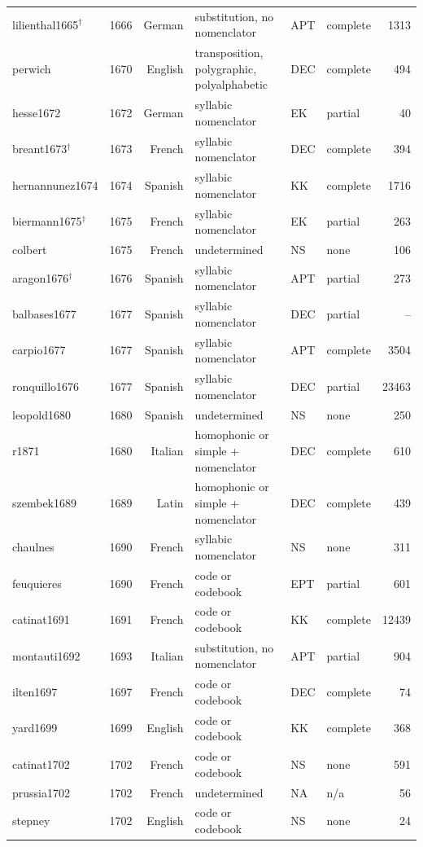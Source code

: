 {\begin{longtable}{@{}llrlllr@{}}
lilienthal1665$^\dagger$ & 1666 & German & substitution, no nomenclator & APT & complete & 1313 \\
perwich & 1670 & English & transposition, polygraphic, polyalphabetic & DEC & complete & 494 \\
hesse1672 & 1672 & German & syllabic nomenclator & EK & partial & 40 \\
breant1673$^\dagger$ & 1673 & French & syllabic nomenclator & DEC & complete & 394 \\
hernannunez1674 & 1674 & Spanish & syllabic nomenclator & KK & complete & 1716 \\
biermann1675$^\dagger$ & 1675 & French & syllabic nomenclator & EK & partial & 263 \\
colbert & 1675 & French & undetermined & NS & none & 106 \\
aragon1676$^\dagger$ & 1676 & Spanish & syllabic nomenclator & APT & partial & 273 \\
balbases1677 & 1677 & Spanish & syllabic nomenclator & DEC & partial & -- \\
carpio1677 & 1677 & Spanish & syllabic nomenclator & APT & complete & 3504 \\
ronquillo1676 & 1677 & Spanish & syllabic nomenclator & DEC & partial & 23463 \\
leopold1680 & 1680 & Spanish & undetermined & NS & none & 250 \\
r1871 & 1680 & Italian & homophonic or simple + nomenclator & DEC & complete & 610 \\
szembek1689 & 1689 & Latin & homophonic or simple + nomenclator & DEC & complete & 439 \\
chaulnes & 1690 & French & syllabic nomenclator & NS & none & 311 \\
feuquieres & 1690 & French & code or codebook & EPT & partial & 601 \\
catinat1691 & 1691 & French & code or codebook & KK & complete & 12439 \\
montauti1692 & 1693 & Italian & substitution, no nomenclator & APT & partial & 904 \\
ilten1697 & 1697 & French & code or codebook & DEC & complete & 74 \\
yard1699 & 1699 & English & code or codebook & KK & complete & 368 \\
catinat1702 & 1702 & French & code or codebook & NS & none & 591 \\
prussia1702 & 1702 & French & undetermined & NA & n/a & 56 \\
stepney & 1702 & English & code or codebook & NS & none & 24 \\

\end{longtable}}
